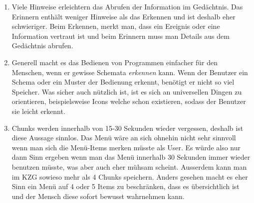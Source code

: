 
\begin{enumerate}[label=\alph*)]

    \item Viele Hinweise erleichtern das Abrufen der Information im Gedächtnis.
Das Erinnern enthält weniger Hinweise als das Erkennen und ist deshalb
eher schwieriger. Beim Erkennen, merkt man, dass ein Ereignis
oder eine Information vertraut ist und beim Erinnern muss man Details
aus dem Gedächtnis abrufen. 
    
    \item Generell macht es das Bedienen von Programmen einfacher für den Menschen, wenn er 
    gewisse Schemata \textit{erkennen} kann. Wenn der Benutzer ein Schema oder ein Muster der Bedienung
    erkennt, benötigt er nicht so viel Speicher. Was sicher auch nützlich ist, ist es sich an universellen 
    Dingen zu orientieren, beispielsweise Icons welche schon existieren, sodass der Benutzer sie leicht erkennt.
    
    \item Chunks werden innerhalb von 15-30 Sekunden wieder vergessen, deshalb ist diese Aussage 
    sinnlos. Das Menü wäre an sich ohnehin nicht sehr sinnvoll wenn man sich die Menü-Items merken müsste als User.
    Es würde also nur dann Sinn ergeben wenn man das Menü innerhalb 30 Sekunden immer wieder benutzen müsste,
    was aber auch eher mühsam scheint. Ausserdem kann man im KZG sowieso mehr als 4 Chunks speichern.
    Anders gesehen macht es eher Sinn ein Menü auf 4 oder 5 Items zu beschränken, dass es übersichtlich ist und 
    der Mensch diese sofort bewusst wahrnehmen kann. 
    
\end{enumerate}
